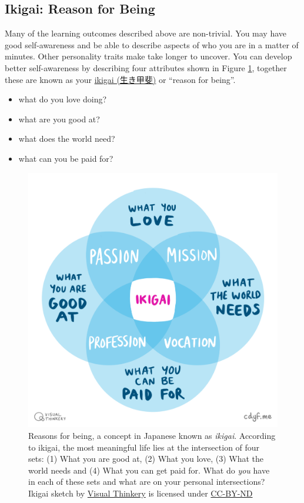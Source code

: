 \documentclass[
]{book}
\providecommand{\tightlist}{%
  \setlength{\itemsep}{0pt}\setlength{\parskip}{0pt}}
\begin{document}
\hypertarget{no42}{%
\subsection{Ikigai: Reason for Being}\label{no42}}

Many of the learning outcomes described above are non-trivial. You may have good self-awareness and be able to describe aspects of who you are in a matter of minutes. Other personality traits make take longer to uncover. You can develop better self-awareness by describing four attributes shown in Figure \ref{fig:iki-fig}, together these are known as your \href{https://en.wikipedia.org/wiki/Ikigai}{ikigai (生き甲斐)} or ``reason for being''.

\begin{itemize}
\tightlist
\item
  what do you love doing?
\item
  what are you good at?
\item
  what does the world need?
\item
  what can you be paid for?
\end{itemize}

\begin{figure}

{\centering \includegraphics[width=1\linewidth]{images/IKIGAI-visual-thinkery} 

}

\caption{Reasons for being, a concept in Japanese known as \emph{ikigai}. According to ikigai, the most meaningful life lies at the intersection of four sets: (1) What you are good at, (2) What you love, (3) What the world needs and (4) What you can get paid for. What do \emph{you} have in each of these sets and what are on your personal intersections? Ikigai sketch by \href{https://visualthinkery.com}{Visual Thinkery} is licensed under \href{https://creativecommons.org/licenses/by-nd/4.0/}{CC-BY-ND}}\label{fig:iki-fig}
\end{figure}
\end{document}
